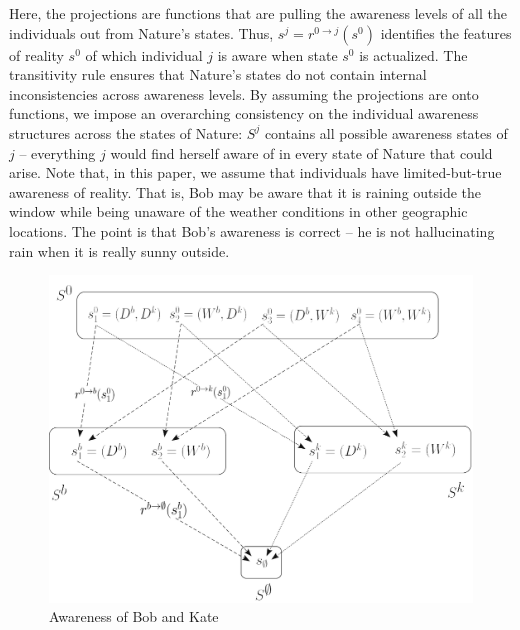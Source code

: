 \documentclass[
11pt,
titlepage,
reqno,
]{article}%
\theoremstyle{definition}
\begin{document}
	Here, the projections are functions that are pulling the awareness levels of all the individuals out from Nature's states.
	Thus, $s^j=r^{0\rightarrow j}(s^0)$ identifies the features of reality $s^0$ of which individual $j$ is aware when state $s^0$ is actualized.
	The transitivity rule ensures that Nature's states do not contain internal inconsistencies across awareness levels.
	By assuming the projections are onto functions, we impose an overarching consistency on the individual awareness structures across the states of Nature:
	$S^j$ contains all possible awareness states of $j$ -- everything $j$ would find herself aware of in every state of Nature that could arise.
	Note that, in this paper, we assume that individuals have limited-but-true awareness of reality.
	That is, Bob may be aware that it is raining outside the window while being unaware of the weather conditions in other geographic locations.
	The point is that Bob's awareness is correct -- he is not hallucinating rain when it is really sunny outside.





	
\begin{figure}[h!]	
	\begin{center}
		\includegraphics[scale=.4]{lattice.png}
	\end{center}
\caption{Awareness of Bob and Kate\label{lattice}}
\end{figure}
\end{document}
